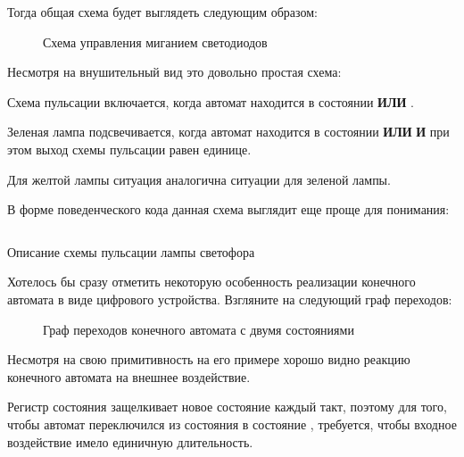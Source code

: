 \par{Тогда общая схема будет выглядеть следующим образом:}

\begin{figure}[H]
  \centering
  \def\svgwidth{\columnwidth}
  
  \caption{Схема управления миганием светодиодов}
\end{figure}

\par{Несмотря на внушительный вид это довольно простая схема:}

\par{Схема пульсации включается, когда автомат находится в состоянии  \textbf{ИЛИ} .}

\par{Зеленая лампа подсвечивается, когда автомат находится в состоянии  \textbf{ИЛИ}  \textbf{И} при этом выход схемы пульсации равен единице.}

\par{Для желтой лампы ситуация аналогична ситуации для зеленой лампы.}

\par{В форме поведенческого кода данная схема выглядит еще проще для понимания:}

%

\begin{listing}[H]
	\inputminted{SystemVerilog}{code_examples/lab_4/pulse.sv}
	\caption{Описание схемы пульсации лампы светофора}
\end{listing}

\par{Хотелось бы сразу отметить некоторую особенность реализации конечного автомата в виде цифрового устройства. Взгляните на следующий граф переходов:}

\begin{figure}[H]
  \centering
  \def\svgwidth{6cm}
  
  \caption{Граф переходов конечного автомата с двумя состояниями}
\end{figure}

\par{Несмотря на свою примитивность на его примере хорошо видно реакцию конечного автомата на внешнее воздействие.}

\par{Регистр состояния защелкивает новое состояние каждый такт, поэтому для того, чтобы автомат переключился из состояния  в состояние , требуется, чтобы входное воздействие  имело единичную длительность.}

